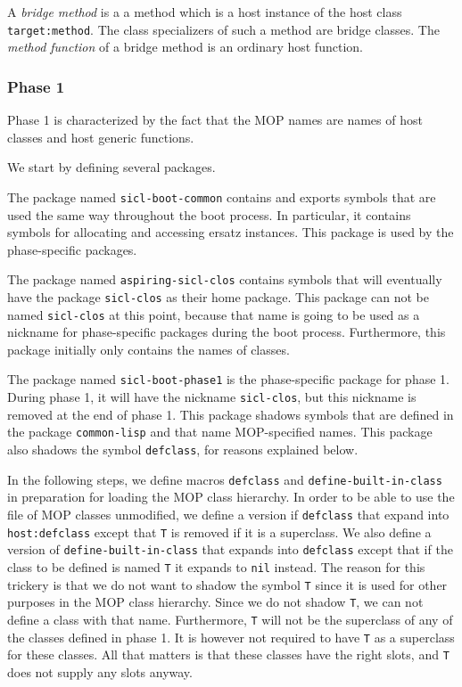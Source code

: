\begin{definition}
A \emph{bridge method} is a a method which is a host instance of the host
class \texttt{target:method}.  The class specializers of such a method are
bridge classes.  The \emph{method function} of a bridge method is an
ordinary host function.
\end{definition}

\subsubsection{Phase 1}

Phase 1 is characterized by the fact that the MOP names are names of
host classes and host generic functions.  

We start by defining several packages.

The package named
\texttt{sicl-boot-common} contains and exports symbols that are used
the same way throughout the boot process.  In particular, it contains
symbols for allocating and accessing ersatz instances.  This package
is used by the phase-specific packages.  

The package named \texttt{aspiring-sicl-clos} contains symbols that
will eventually have the package \texttt{sicl-clos} as their home
package.  This package can not be named \texttt{sicl-clos} at this
point, because that name is going to be used as a nickname for
phase-specific packages during the boot process.  Furthermore, this
package initially only contains the names of classes.  

The package named \texttt{sicl-boot-phase1} is the phase-specific
package for phase 1.  During phase 1, it will have the nickname
\texttt{sicl-clos}, but this nickname is removed at the end of phase
1.   This package shadows symbols that are defined in the package
\texttt{common-lisp} and that name MOP-specified names.  This package
also shadows the symbol \texttt{defclass}, for reasons explained
below. 

In the following steps, we define macros \texttt{defclass} and
\texttt{define-built-in-class} in preparation for loading the MOP
class hierarchy.  In order to be able to use the file of MOP classes
unmodified, we define a version if \texttt{defclass} that expand into
\texttt{host:defclass} except that \texttt{T} is removed if it is a
superclass.  We also define a version of
\texttt{define-built-in-class} that expands into \texttt{defclass}
except that if the class to be defined is named \texttt{T} it expands
to \texttt{nil} instead.  The reason for this trickery is that we do
not want to shadow the symbol \texttt{T} since it is used for other
purposes in the MOP class hierarchy.  Since we do not shadow
\texttt{T}, we can not define a class with that name.  Furthermore,
\texttt{T} will not be the superclass of any of the classes defined in
phase 1.  It is however not required to have \texttt{T} as a
superclass for these classes.  All that matters is that these classes
have the right slots, and \texttt{T} does not supply any slots anyway.

